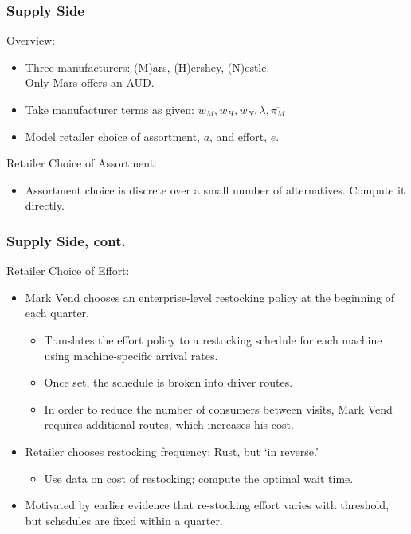 \documentclass[aspectratio=169,11pt]{beamer}
\begin{document}
\begin{frame}
\frametitle{Supply Side}
Overview:
\begin{itemize}
\item Three manufacturers:  (M)ars, (H)ershey, (N)estle. \\ Only Mars offers an AUD.
\item Take manufacturer terms as given: $w_M, w_H, w_N, \lambda, \overline{\pi_M}$
\item Model retailer choice of assortment, $a$, and effort, $e$.%
\end{itemize}
Retailer Choice of Assortment:
\begin{itemize}
\item Assortment choice is discrete over a small number of alternatives. Compute it directly.
\end{itemize}
\end{frame}

\begin{frame}
\frametitle{Supply Side, cont.}

Retailer Choice of Effort:
\begin{itemize}
\item Mark Vend chooses an enterprise-level restocking policy at the beginning of each quarter.
	\begin{itemize}
	\item Translates the effort policy to a restocking schedule for each machine using machine-specific arrival rates.
	\item Once set, the schedule is broken into driver routes.
	\item In order to reduce the number of consumers between visits, Mark Vend requires additional routes, which increases his cost.
	\end{itemize}
\item Retailer chooses restocking frequency: Rust, but `in reverse.'
\begin{itemize}
\item Use data on cost of restocking; compute the optimal wait time.
\end{itemize}
\item Motivated by earlier evidence that re-stocking effort varies with threshold, but schedules are fixed within a quarter.
\end{itemize}
\end{frame}
\end{document}
